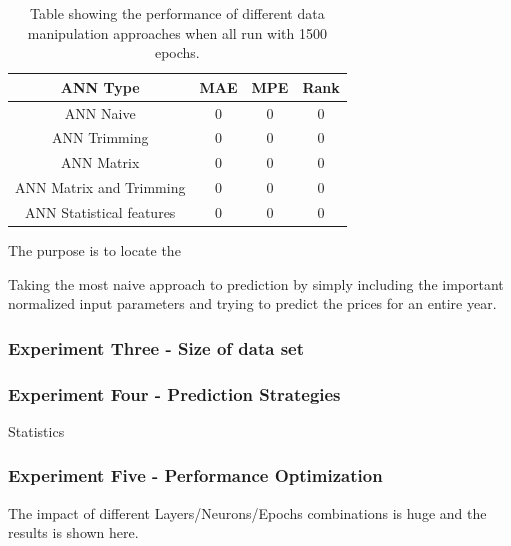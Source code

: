 
\begin{table}[H]
\centering  %
\begin{tabular}{c c c c} %
ANN Type & MAE & MPE & Rank \\ [0.5ex] %
\hline                  %
ANN Naive & 0 & 0 & 0 \\ %
ANN Trimming & 0 & 0 & 0 \\
ANN Matrix  & 0 & 0 & 0\\
ANN Matrix and Trimming  & 0 & 0 & 0 \\ 
ANN Statistical features  & 0 & 0 & 0\\ [1ex] %
\hline %
\end{tabular}
\caption{Table showing the performance of different data manipulation approaches when all run with 1500 epochs.} %
\label{table:dataManipulationApproaches} %
\end{table}


The purpose is to locate the 


Taking the most naive approach to prediction by simply including the important normalized input parameters and trying to predict the prices for an entire year. 

\subsubsection{Experiment Three - Size of data set}

\subsubsection{Experiment Four - Prediction Strategies}
Statistics


\subsubsection{Experiment Five - Performance Optimization}
The impact of different Layers/Neurons/Epochs combinations is huge and the results is shown here.


